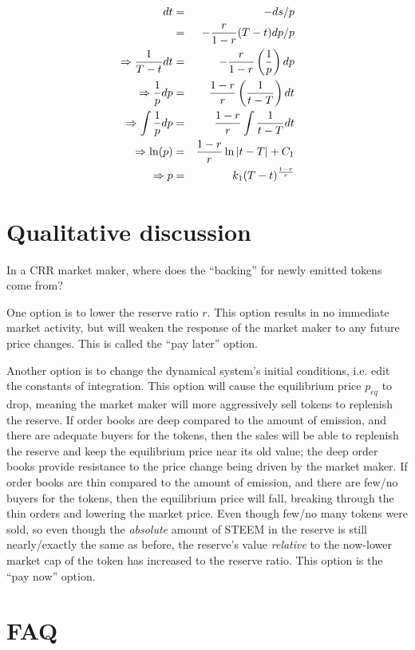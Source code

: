 \documentclass{article}
\begin{document}
\begin{eqnarray*}
dt & = & -ds / p \\
   & = & -{r \over 1-r} (T - t) dp / p \\
\Rightarrow {1 \over T-t} dt & = & -{r \over 1-r} \left( {1 \over p} \right) dp \\
\Rightarrow {1 \over p} dp & = & {1-r \over r} \left( {1 \over t-T} \right) dt \\
\Rightarrow \int {1 \over p} dp & = & {1-r \over r} \int {1 \over t-T} dt \\
\Rightarrow \ln(p) & = & {1-r \over r} \ln | t-T | + C_1 \\
\Rightarrow p & = & k_1 (T-t)^{1-r \over r}
\end{eqnarray*}

\section{Qualitative discussion}

In a CRR market maker, where does the ``backing'' for newly emitted tokens come from?

One option is to lower the reserve ratio $r$.  This option results in no immediate market
activity, but will weaken the response of the market maker to any future price changes.
This is called the ``pay later'' option.

Another option is to change the dynamical system's initial conditions, i.e. edit the
constants of integration.  This option will cause the equilibrium price $p_{eq}$ to drop,
meaning the market maker will more aggressively sell tokens to replenish the reserve.
If order books are deep compared to the amount of emission, and there are adequate buyers
for the tokens, then the sales will be able to replenish the reserve and keep the equilibrium
price near its old value; the deep order books provide resistance to the price change being
driven by the market maker.  If order books are thin compared to the amount of emission,
and there are few/no buyers for the tokens, then the equilibrium price will fall, breaking
through the thin orders and lowering the market price.  Even though few/no many tokens were
sold, so even though the \textit{absolute} amount of STEEM in the reserve is still
nearly/exactly the same as before, the reserve's value \textit{relative} to the now-lower
market cap of the token has increased to the reserve ratio.  This option is the ``pay now''
option.




\section{FAQ}
\end{document}
